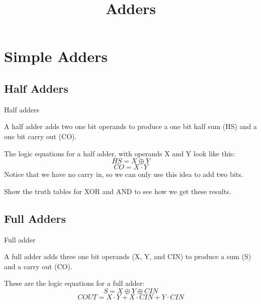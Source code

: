\title{Adders}

\section{Simple Adders}
\subsection{Half Adders}

\begin{frame}{Half adders}
  \begin{definition}
    A \alert{half adder} adds two one bit operands to produce a one bit half sum (HS) and a one bit carry out (CO).
  \end{definition}
  The logic equations for a half adder, with operands X and Y look like this:
  $$HS = X \oplus Y$$
  $$CO = X \cdot Y$$
  Notice that we have no carry in, so we can only use this idea to add two bits.
\end{frame}

Show the truth tables for XOR and AND to see how we get these results.

\subsection{Full Adders}

\begin{frame}{Full adder}
  \begin{definition}
    A \alert{full adder} adds three one bit operands (X, Y, and CIN) to produce a sum (S) and a carry out (CO).
  \end{definition}
  These are the logic equations for a full adder:
  $$S = X \oplus Y \oplus CIN$$
  $$COUT = X \cdot Y + X \cdot CIN + Y \cdot CIN$$
\end{frame}


